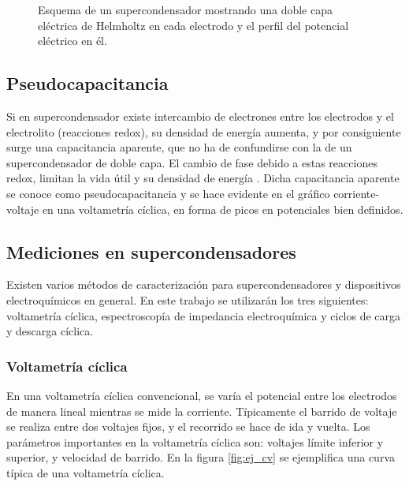 \begin{figure}[h!]
	\centering
	\caption[Esquema de un supercondensador]{Esquema de un supercondensador mostrando una doble capa eléctrica de Helmholtz en cada electrodo y el perfil del potencial eléctrico en él.}
	\label{fig:edlc}
\end{figure}

\subsection{Pseudocapacitancia}
Si en supercondensador existe intercambio de electrones entre los electrodos y el electrolito (reacciones redox), su densidad de energía aumenta, y por consiguiente surge una capacitancia aparente, que no ha de confundirse con la de un supercondensador de doble capa. El cambio de fase debido a estas reacciones redox, limitan la vida útil y su densidad de energía \citep{Frackowiak2001}. Dicha capacitancia aparente se conoce como pseudocapacitancia y se hace evidente en el gráfico corriente-voltaje en una voltametría cíclica, en forma de picos en potenciales bien definidos.


\subsection{Mediciones en supercondensadores}
Existen varios métodos de caracterización para supercondensadores y dispositivos electroquímicos en general. En este trabajo se utilizarán los tres siguientes: voltametría cíclica, espectroscopía de impedancia electroquímica y ciclos de carga y descarga cíclica.
\subsubsection{Voltametría cíclica}
En una voltametría cíclica convencional, se varía el potencial entre los electrodos de manera lineal mientras se mide la corriente. Típicamente el barrido de voltaje se realiza entre dos voltajes fijos, y el recorrido se hace de ida y vuelta. Los parámetros importantes en la voltametría cíclica son: voltajes límite inferior y superior, y velocidad de barrido. En la figura \ref{fig:ej_cv} se ejemplifica una curva típica de una voltametría cíclica.

